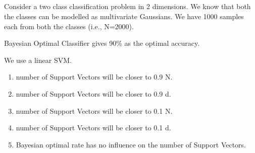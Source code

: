 \begin{frame}
\section{}
Consider a two class classification problem in 2 dimensions. We know that both the classes can be modelled as multivariate Gaussians. We have 1000 samples each from both the classes (i.e., N=2000).

Bayesian Optimal Classifier gives 90\% as the optimal accuracy.

We use a linear SVM.

\begin{enumerate}[label=(\Alph*)]
\item number of Support Vectors will be closer to 0.9 N.
\item number of Support Vectors will be closer to 0.9 d.
\item number of Support Vectors will be closer to 0.1 N.    %
\item number of Support Vectors will be closer to 0.1 d.
\item Bayesian optimal rate has no influence on the number of Support Vectors.
\end{enumerate}
\end{frame}
